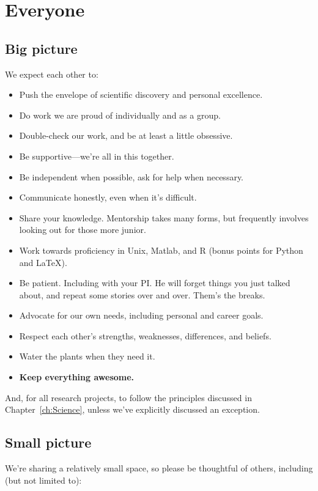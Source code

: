 \documentclass[letterpaper,12pt,oneside]{memoir}
\begin{document}
\section{Everyone}

\subsection{Big picture}

We expect each other to:

\begin{itemize}
\item Push the envelope of scientific discovery and personal excellence. 
\item Do work we are proud of individually and as a group.
\item Double-check our work, and be at least a little obsessive.
\item Be supportive---we're all in this together.
\item Be independent when possible, ask for help when necessary.
\item Communicate honestly, even when it's difficult.
\item Share your knowledge. Mentorship takes many forms, but frequently involves looking out for those more junior.
\item Work towards proficiency in Unix, Matlab, and R (bonus points for Python and LaTeX).
\item Be patient. Including with your PI. He will forget things you just talked about, and repeat some stories over and over. Them's the breaks.
\item Advocate for our own needs, including personal and career goals.
\item Respect each other's strengths, weaknesses, differences, and beliefs.
\item Water the plants when they need it.
\item \textbf{Keep everything awesome.}
\end{itemize}

And, for all research projects, to follow the principles discussed in Chapter~\ref{ch:Science}, unless we've explicitly discussed an exception.

\subsection{Small picture}

We're sharing a relatively small space, so please be thoughtful of others, including (but not limited to):
\end{document}
